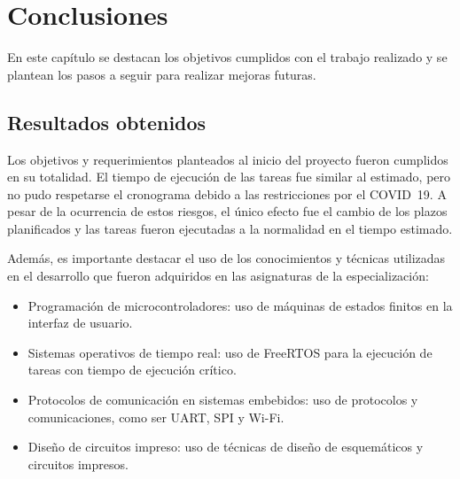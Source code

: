 
\chapter{Conclusiones} %

\label{Chapter5} %



En este capítulo se destacan los objetivos cumplidos con el trabajo realizado y se plantean los pasos a seguir para realizar mejoras futuras.


\section{Resultados obtenidos }

Los objetivos y requerimientos planteados al inicio del proyecto fueron cumplidos en su totalidad. El tiempo de ejecución de las tareas fue similar al estimado, pero no pudo respetarse el cronograma debido a las restricciones por el COVID~19. A pesar de la ocurrencia de estos riesgos, el único efecto fue el cambio de los plazos planificados y las tareas fueron ejecutadas a la normalidad en el tiempo estimado.

Además, es importante destacar el uso de los conocimientos y técnicas utilizadas en el desarrollo que fueron adquiridos en las asignaturas de la especialización:
\begin{itemize}
 \item Programación de microcontroladores: uso de máquinas de estados finitos en la interfaz de usuario.
 \item Sistemas operativos de tiempo real: uso de FreeRTOS para la ejecución de tareas con tiempo de ejecución crítico.
 \item Protocolos de comunicación en sistemas embebidos: uso de protocolos y comunicaciones, como ser UART, SPI y Wi-Fi.
 \item Diseño de circuitos impreso: uso de técnicas de diseño de esquemáticos y circuitos impresos.
\end{itemize}

